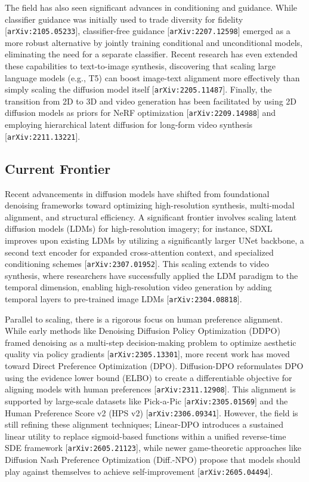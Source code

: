 \documentclass[11pt]{article}
\begin{document}
The field has also seen significant advances in conditioning and guidance. While classifier guidance was initially used to trade diversity for fidelity [\texttt{arXiv:2105.05233}], classifier-free guidance [\texttt{arXiv:2207.12598}] emerged as a more robust alternative by jointly training conditional and unconditional models, eliminating the need for a separate classifier. Recent research has even extended these capabilities to text-to-image synthesis, discovering that scaling large language models (e.g., T5) can boost image-text alignment more effectively than simply scaling the diffusion model itself [\texttt{arXiv:2205.11487}]. Finally, the transition from 2D to 3D and video generation has been facilitated by using 2D diffusion models as priors for NeRF optimization [\texttt{arXiv:2209.14988}] and employing hierarchical latent diffusion for long-form video synthesis [\texttt{arXiv:2211.13221}].

\subsection{Current Frontier}

Recent advancements in diffusion models have shifted from foundational denoising frameworks toward optimizing high-resolution synthesis, multi-modal alignment, and structural efficiency. A significant frontier involves scaling latent diffusion models (LDMs) for high-resolution imagery; for instance, SDXL improves upon existing LDMs by utilizing a significantly larger UNet backbone, a second text encoder for expanded cross-attention context, and specialized conditioning schemes [\texttt{arXiv:2307.01952}]. This scaling extends to video synthesis, where researchers have successfully applied the LDM paradigm to the temporal dimension, enabling high-resolution video generation by adding temporal layers to pre-trained image LDMs [\texttt{arXiv:2304.08818}].

Parallel to scaling, there is a rigorous focus on human preference alignment. While early methods like Denoising Diffusion Policy Optimization (DDPO) framed denoising as a multi-step decision-making problem to optimize aesthetic quality via policy gradients [\texttt{arXiv:2305.13301}], more recent work has moved toward Direct Preference Optimization (DPO). Diffusion-DPO reformulates DPO using the evidence lower bound (ELBO) to create a differentiable objective for aligning models with human preferences [\texttt{arXiv:2311.12908}]. This alignment is supported by large-scale datasets like Pick-a-Pic [\texttt{arXiv:2305.01569}] and the Human Preference Score v2 (HPS v2) [\texttt{arXiv:2306.09341}]. However, the field is still refining these alignment techniques; Linear-DPO introduces a sustained linear utility to replace sigmoid-based functions within a unified reverse-time SDE framework [\texttt{arXiv:2605.21123}], while newer game-theoretic approaches like Diffusion Nash Preference Optimization (Diff.-NPO) propose that models should play against themselves to achieve self-improvement [\texttt{arXiv:2605.04494}].
\end{document}

